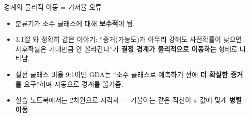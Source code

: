 \begin{frame}{경계의 물리적 이동 = 기저율 오류}
  \begin{itemize}
    \item 분류기가 소수 클래스에 대해 \textbf{보수적}이 됨.
    \item 3.1절 와 정확히 같은 이야기:
      ``증거(가능도)가 아무리 강해도 사전확률이 낮으면 사후확률은
      기대만큼 안 올라간다''가 \textbf{결정 경계가 물리적으로
      이동하는} 형태로 나타남.
    \item 실전 클래스 비율 9:1이면 GDA는 ``소수 클래스로 예측하기
      전에 \textbf{더 확실한 증거}를 요구''하며 자동으로 경계를 옮겨줌.
    \item 실습 노트북에서는 2차원으로 시각화 --- 기울이는 같은 직선이
      $\phi$ 값에 맞게 \textbf{병렬 이동}.
  \end{itemize}
\end{frame}
